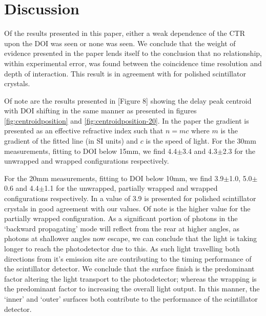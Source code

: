 \section{Discussion}
Of the results presented in this paper, either a weak dependence of the CTR upon the DOI was seen or none was seen. We conclude that the weight of evidence presented in the paper lends itself to the conclusion that no relationship, within experimental error, was found between the coincidence time resolution and depth of interaction. This result is in agreement with \cite{Bircher_Shao_2012} for polished scintillator crystals. 


Of note are the results presented in [Figure 8]\cite{Moses_Derenzo_1999} showing the delay peak centroid with DOI shifting in the same manner as presented in figures \ref{fig:centroidposition} and \ref{fig:centroidposition-20}. In the paper the gradient is presented as an effective refractive index such that $n=mc$ where $m$ is the gradient of the fitted line (in SI units) and $c$ is the speed of light. For the 30mm measurements, fitting to DOI below 15mm, we find 4.4$\pm$3.4 and 4.3$\pm$2.3 for the unwrapped and wrapped configurations respectively. 


For the 20mm measurements, fitting to DOI below 10mm, we find 3.9$\pm$1.0, 5.0$\pm$0.6 and 4.4$\pm$1.1 for the unwrapped, partially wrapped and wrapped configurations respectively. In \cite{Moses_Derenzo_1999} a value of 3.9 is presented for polished scintillator crystals in good agreement with our values. Of note is the higher value for the partially wrapped configuration. As a significant portion of photons in the `backward propagating' mode will reflect from the rear at higher angles, as photons at shallower angles now escape, we can conclude that the light is taking longer to reach the photodetector due to this. As such light travelling both directions from it's emission site are contributing to the timing performance of the scintillator detector. We conclude that the surface finish is the predominant factor altering the light transport to the photodetector; whereas the wrapping is the predominant factor to increasing the overall light output. In this manner, the `inner' and `outer' surfaces both contribute to the performance of the scintillator detector.